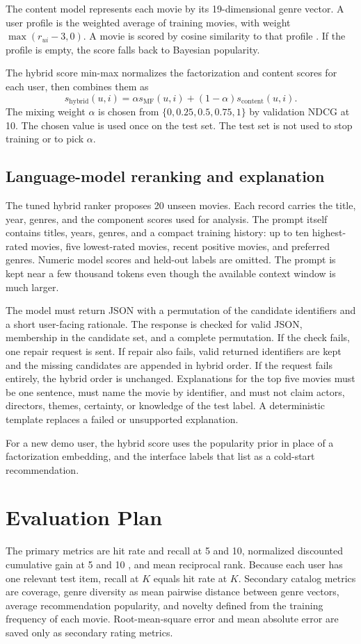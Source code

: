 \documentclass[conference]{IEEEtran}
\begin{document}
The content model represents each movie by its 19-dimensional genre vector. A user profile is the weighted average of training movies, with weight \(\max(r_{ui}-3,0)\). A movie is scored by cosine similarity to that profile \cite{lops2011}. If the profile is empty, the score falls back to Bayesian popularity.

The hybrid score min-max normalizes the factorization and content scores for each user, then combines them as
\begin{equation}
s_{\mathrm{hybrid}}(u,i)=\alpha s_{\mathrm{MF}}(u,i)+(1-\alpha)s_{\mathrm{content}}(u,i).
\end{equation}
The mixing weight \(\alpha\) is chosen from \(\{0, 0.25, 0.5, 0.75, 1\}\) by validation NDCG at 10. The chosen value is used once on the test set. The test set is not used to stop training or to pick \(\alpha\).

\subsection{Language-model reranking and explanation}
The tuned hybrid ranker proposes 20 unseen movies. Each record carries the title, year, genres, and the component scores used for analysis. The prompt itself contains titles, years, genres, and a compact training history: up to ten highest-rated movies, five lowest-rated movies, recent positive movies, and preferred genres. Numeric model scores and held-out labels are omitted. The prompt is kept near a few thousand tokens even though the available context window is much larger.

The model must return JSON with a permutation of the candidate identifiers and a short user-facing rationale. The response is checked for valid JSON, membership in the candidate set, and a complete permutation. If the check fails, one repair request is sent. If repair also fails, valid returned identifiers are kept and the missing candidates are appended in hybrid order. If the request fails entirely, the hybrid order is unchanged. Explanations for the top five movies must be one sentence, must name the movie by identifier, and must not claim actors, directors, themes, certainty, or knowledge of the test label. A deterministic template replaces a failed or unsupported explanation.

For a new demo user, the hybrid score uses the popularity prior in place of a factorization embedding, and the interface labels that list as a cold-start recommendation.

\section{Evaluation Plan}
The primary metrics are hit rate and recall at 5 and 10, normalized discounted cumulative gain at 5 and 10 \cite{jarvelin2002}, and mean reciprocal rank. Because each user has one relevant test item, recall at \(K\) equals hit rate at \(K\). Secondary catalog metrics are coverage, genre diversity as mean pairwise distance between genre vectors, average recommendation popularity, and novelty defined from the training frequency of each movie. Root-mean-square error and mean absolute error are saved only as secondary rating metrics.
\end{document}
